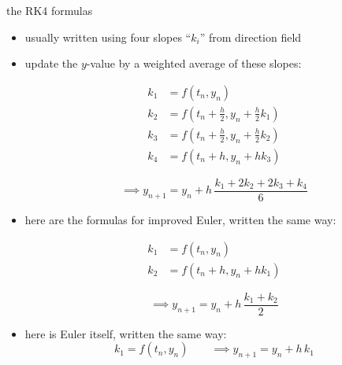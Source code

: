\documentclass[urlcolor=blue,dvipsnames]{beamer}
\begin{document}
\begin{frame}{the RK4 formulas}

\small
\begin{itemize}
\item usually written using four slopes ``$k_i$'' from direction field
\item update the $y$-value by a weighted average of these slopes:

\vspace{-6mm}
\begin{minipage}[t]{0.4\textwidth}
\begin{align*}
k_1 &= f(t_n,y_n) \\
k_2 &= f(t_n+\frac{h}{2},y_n+\frac{h}{2} k_1) \\
k_3 &= f(t_n+\frac{h}{2},y_n+\frac{h}{2} k_2) \\
k_4 &= f(t_n+h,y_n+h k_3)
\end{align*}
\end{minipage}\begin{minipage}[t]{0.45\textwidth}
\vspace{10mm}

$$\implies y_{n+1} = y_n + h\, \frac{k_1 + 2 k_2 + 2 k_3 + k_4}{6}$$
\end{minipage}
\item here are the formulas for improved Euler, written the same way:

\vspace{-6mm}
\begin{minipage}[t]{0.4\textwidth}
\begin{align*}
k_1 &= f(t_n,y_n) \\
k_2 &= f(t_n+h,y_n+h k_1)
\end{align*}
\end{minipage}
\begin{minipage}[t]{0.4\textwidth}
\vspace{2mm}

$$\implies y_{n+1} = y_n + h\, \frac{k_1 + k_2}{2}$$
\end{minipage}
\item here is Euler itself, written the same way:
$$k_1 = f(t_n,y_n) \qquad \implies y_{n+1} = y_n + h\, k_1$$
\end{itemize}
\end{frame}
\end{document}
